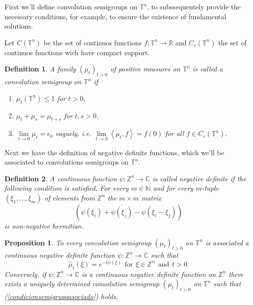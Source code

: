 \documentclass[11pt]{article}
\newtheorem{proposition}{Proposition}
\newtheorem{definition}{Definition}
\begin{document}
First we'll define convolution semigroups on $\mathbb{T}^n$, to subssequentely provide the necessary conditions, for example, to ensure the existence of fundamental solutions.

Let $C(\mathbb{T}^n)$ be the set of continuos functions $f:\mathbb{T}^n \to \mathbb{R}$ and $C_c (\mathbb{T}^n)$ the set of continuos functions wich have compact support.

\begin{definition}
	A family $(\mu_t)_{t>0}$ of positive measures on $\mathbb{T}^n$ is called a convolution semigroup on $\mathbb{T}^n$ if
	\begin{enumerate}[label=(\roman*)]
		\item $\mu_t (\mathbb{T}^n)\le 1$ for $t>0$,
		\item $\mu_t + \mu_s = \mu_{t+s}$ for $t,s>0$,
		\item $\lim\limits_{t \to 0}\mu_t = \epsilon_0$ vaguely, i.e. $\lim\limits_{t \to 0} \left<\mu_t , f \right> = f(0)$ for all $f \in C_c (\mathbb{T}^n).$
	\end{enumerate}
\end{definition}

Next we have the definition of negative definite functions, which we'll be associated to convolutions semigroups on $\mathbb{T}^n$.

\begin{definition}
	A continuous function $\psi : \mathbb{Z}^n \to \mathbb{C}$ is called negative definite if the following condition is satisfied. For every $m \in \mathbb{N}$ and for every $m$-tuple $(\xi_1, \dots,\xi_m)$ of elements from $\mathbb{Z}^n$ the $m \times m$ matrix $$ (\psi(\xi_i)+\overline{\psi(\xi_j)}-\psi(\xi_i - \xi_j))$$ is non-negative hermitian.
\end{definition}

\begin{proposition}
	To every convolution semigroup $(\mu_t)_{t>0}$ on $\mathbb{T}^n$ is associated a continuous negative definite function $\psi : \mathbb{Z}^n \to \mathbb{C}$ such that
	\begin{equation}\label{condicionsemigrupoasociado}
		\hat{\mu}_t (\xi) = e^{-t\psi(\xi)} \hspace{5pt}\text{for}\hspace{5pt} \xi \in \mathbb{Z}^n\hspace{5pt}\text{and} \hspace{5pt}t>0.
	\end{equation}
 Conversely, if $\psi : \mathbb{Z}^n \to \mathbb{C}$ is a continuous negative definite function on $\mathbb{Z}^n$ there exists a uniquely determined convolution semigroup $(\mu_t)_{t>0}$ on $\mathbb{T}^n$ such that (\ref{condicionsemigrupoasociado}) holds.
\end{proposition}
\end{document}
